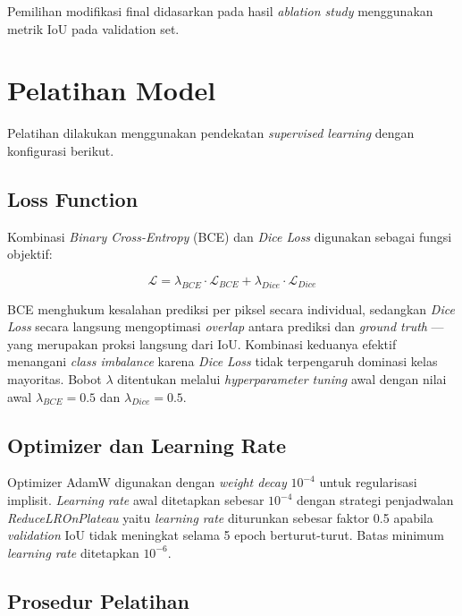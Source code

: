 Pemilihan modifikasi final didasarkan pada hasil \textit{ablation study} menggunakan metrik IoU pada validation set.

\section{Pelatihan Model}

Pelatihan dilakukan menggunakan pendekatan \textit{supervised learning} dengan konfigurasi berikut.

\subsection{Loss Function}

Kombinasi \textit{Binary Cross-Entropy} (BCE) dan \textit{Dice Loss} digunakan sebagai fungsi objektif:

\begin{equation}
	\mathcal{L} = \lambda_{BCE} \cdot \mathcal{L}_{BCE} + \lambda_{Dice} \cdot \mathcal{L}_{Dice}
\end{equation}

BCE menghukum kesalahan prediksi per piksel secara individual, sedangkan \textit{Dice Loss} secara langsung mengoptimasi \textit{overlap} antara prediksi dan \textit{ground truth} — yang merupakan proksi langsung dari IoU. Kombinasi keduanya efektif menangani \textit{class imbalance} karena \textit{Dice Loss} tidak terpengaruh dominasi kelas mayoritas. Bobot $\lambda$ ditentukan melalui \textit{hyperparameter tuning} awal dengan nilai awal $\lambda_{BCE} = 0.5$ dan $\lambda_{Dice} = 0.5$.

\subsection{Optimizer dan Learning Rate}

Optimizer AdamW digunakan dengan \textit{weight decay} $10^{-4}$ untuk regularisasi implisit. \textit{Learning rate} awal ditetapkan sebesar $10^{-4}$ dengan strategi penjadwalan \textit{ReduceLROnPlateau} yaitu \textit{learning rate} diturunkan sebesar faktor 0.5 apabila \textit{validation} IoU tidak meningkat selama 5 epoch berturut-turut. Batas minimum \textit{learning rate} ditetapkan $10^{-6}$.

\subsection{Prosedur Pelatihan}

